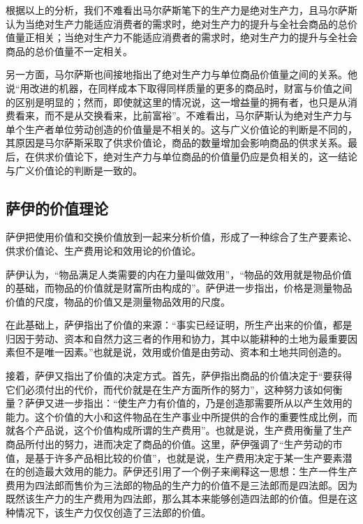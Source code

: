 根据以上的分析，我们不难看出马尔萨斯笔下的生产力是绝对生产力，且马尔萨斯认为当绝对生产力能适应消费者的需求时，绝对生产力的提升与全社会商品的总价值量正相关；当绝对生产力不能适应消费者的需求时，绝对生产力的提升与全社会商品的总价值量不一定相关。

另一方面，马尔萨斯也间接地指出了绝对生产力与单位商品价值量之间的关系。他说“用改进的机器，在同样成本下取得同样质量的更多的商品时，财富与价值之间的区别是明显的；然而，即使就这里的情况说，这一增益量的拥有者，也只是从消费看来，而不是从交换看来，比前富裕”\cite[291]{BiLuo*SiLaFaDaWeiLiJiaTuQuanJiDi2JuanMaErSaSiZhengZhiJingJiXueYuanLiPingZhu2013}。不难看出，马尔萨斯认为绝对生产力与单个生产者单位劳动创造的价值量是不相关的。这与广义价值论的判断是不同的，其原因是马尔萨斯采取了供求价值论，商品的数量增加会影响商品的供求关系。最后，在供求价值论下，绝对生产力与单位商品的价值量仍应是负相关的，这一结论与广义价值论的判断是一致的。

\subsection{萨伊的价值理论}

萨伊把使用价值和交换价值放到一起来分析价值，形成了一种综合了生产要素论、供求价值论、生产费用论和效用论的价值论\cite[138]{YanZhiJieXiFangJingJiXueShuoShiJiaoChengDiErBan2013}。

萨伊认为，“物品满足人类需要的内在力量叫做效用”，“物品的效用就是物品价值的基础，而物品的价值就是财富所由构成的”\cite[59]{SaYiZhengZhiJingJiXueGaiLunCaiFuDeShengChanFenPeiHeXiaoFei2020}。萨伊进一步指出，价格是测量物品价值的尺度，物品的价值又是测量物品效用的尺度\cite[60]{SaYiZhengZhiJingJiXueGaiLunCaiFuDeShengChanFenPeiHeXiaoFei2020}。

在此基础上，萨伊指出了价值的来源：“事实已经证明，所生产出来的价值，都是归因于劳动、资本和自然力这三者的作用和协力，其中以能耕种的土地为最重要因素但不是唯一因素。”\cite[78]{SaYiZhengZhiJingJiXueGaiLunCaiFuDeShengChanFenPeiHeXiaoFei2020}也就是说，效用或价值是由劳动、资本和土地共同创造的。

接着，萨伊又指出了价值的决定方式。首先，萨伊指出商品的价值决定于“要获得它们必须付出的代价，而代价就是在生产方面所作的努力”\cite[351]{SaYiZhengZhiJingJiXueGaiLunCaiFuDeShengChanFenPeiHeXiaoFei2020}，这种努力该如何衡量？萨伊又进一步指出：“使生产力有价值的，乃是创造那需要所从以产生效用的能力。这个价值的大小和这件物品在生产事业中所提供的合作的重要性成比例，而就各个产品说，这个价值构成所谓的生产费用”\cite[352]{SaYiZhengZhiJingJiXueGaiLunCaiFuDeShengChanFenPeiHeXiaoFei2020}。也就是说，生产费用衡量了生产商品所付出的努力，进而决定了商品的价值。这里，萨伊强调了“生产劳动的市值，是基于许多产品相比较的价值”\cite[352]{SaYiZhengZhiJingJiXueGaiLunCaiFuDeShengChanFenPeiHeXiaoFei2020}，也就是说，生产费用决定于某一生产要素潜在的创造最大效用的能力。萨伊还引用了一个例子来阐释这一思想：生产一件生产费用为四法郎而售价为三法郎的物品的生产力的价值不是三法郎而是四法郎。因为既然该生产力的生产费用为四法郎，那么其本来能够创造四法郎的价值。但是在这种情况下，该生产力仅仅创造了三法郎的价值\cite[352]{SaYiZhengZhiJingJiXueGaiLunCaiFuDeShengChanFenPeiHeXiaoFei2020}。

